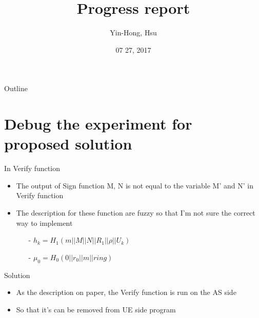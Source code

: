 \documentclass{beamer}
\title {
    Progress report
}
\author {
    Yin-Hong, Hsu
}
\date {
    07 27, 2017
}
\begin{document}
\begin{frame}
    \titlepage
\end{frame}


\begin{frame}{Outline}
    \tableofcontentsgather
    \tableofcontents
\end{frame}

\section{Debug the experiment for proposed solution}

\begin{frame}{In Verify function}
    \begin{itemize}
        \item {The output of Sign function M, N is not equal to the variable M' and N' in Verify function}
        \item {The description for these function are fuzzy so that I'm not sure the correct way to implement}
        \begin{itemize}
            \item [-] {$h_k = H_1(m||M||N||R_1||\rho ||U_k)$}
            \item [-] {$\mu_0 = H_0(0||r_0||m||ring)$}
        \end{itemize}
    \end{itemize}
\end{frame}
\begin{frame} {Solution}  
    \begin{itemize}
        \item {As the description on paper, the Verify function is run on the AS side}
        \item {So that it's can be removed from UE side program}
    \end{itemize}
\end{frame}
\end{document}
